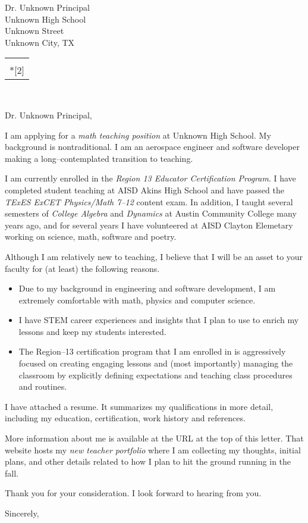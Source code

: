 \documentclass[12pt]{letter}
\makeatletter
\newcommand{\principalname}{Dr. Unknown Principal}
\newcommand{\schoolname}{Unknown High School}
\newcommand{\schoolstreetaddress}{Unknown Street}
\newcommand{\schoolcitystate}{Unknown City, TX}
\renewcommand*{\opening}[1]{\ifx\@empty\fromaddress
    \thispagestyle{firstpage}%
      {\raggedleft\@date\par}%
    \else  %
      \thispagestyle{empty}%
      {\raggedleft\begin{tabular}{l@{}}\ignorespaces
        \fromaddress \\*[2\parskip]%
        \end{tabular}\par
       \raggedright\@date\par}%
    \fi
    \vspace{2\parskip}%
    {\raggedright \toname \\ \toaddress \par}%
    \vspace{2\parskip}%
    #1\par\nobreak}
\makeatother
\begin{document}
  \selectfont
  \begin{letter}{\principalname\\ \schoolname \\ \schoolstreetaddress\\ \schoolcitystate}
  \opening{\principalname,}

  I am applying for a \textit{math teaching position} at \schoolname.
  My background is nontraditional.
  I am an aerospace engineer and software developer making a long--contemplated transition to teaching.

  I am currently enrolled in the
  \textit{Region 13 Educator Certification Program}.
  I have completed student teaching at AISD Akins High School
  and have passed the
  \textit{TExES ExCET Physics/Math 7--12} content exam.
  In addition, I taught several semesters of \textit{College Algebra} and \textit{Dynamics} 
  at Austin Community College many years ago,
  and for several years I have volunteered at AISD Clayton Elemetary
  working on science, math, software and poetry.

  Although I am relatively new to teaching,
  I believe that I will be an asset to your faculty for (at least) the following reasons.
  \begin{itemize}
    \item Due to my background in engineering and software development,
    I am extremely comfortable with math, physics and computer science.
    \item I have STEM career experiences and insights that I plan to use 
    to enrich my lessons and keep my students interested.
    \item The Region--13 certification program that I am enrolled in
    is aggressively focused on creating engaging lessons and (most importantly)
    managing the classroom by explicitly defining expectations and teaching
    class procedures and routines.
  \end{itemize}
    
    I have attached a resume.
    It summarizes my qualifications in more detail, including my
    education, certification, work history and references.

    More information about me is available 
    at the URL at the top of this letter. 
    That website hosts my 
    \textit{new teacher portfolio} where I am collecting my thoughts, initial plans, and 
    other details related to how I plan to hit the ground running in the fall.

    Thank you for your consideration.
    I look forward to hearing from you.

  \closing{Sincerely,}
  \end{letter}
  
\end{document}
